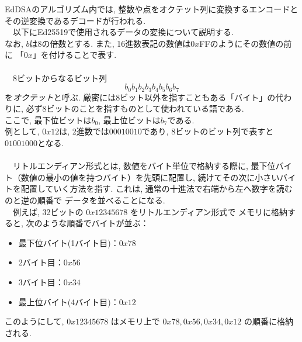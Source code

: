 EdDSAのアルゴリズム内では, 整数や点をオクテット列に変換するエンコードと
その逆変換であるデコードが行われる\cite{インフォーズ}.\\
　以下にEd25519で使用されるデータの変換について説明する.\\
なお, $b$は8の倍数とする. 
また, 16進数表記の数値は$0x$FFのようにその数値の前に
「$0x$」を付けることで表す.\\[1em]

\\
　8ビットからなるビット列
\[
b_0b_1b_2b_3b_4b_5b_6b_7
\]
を\emph{オクテット}と呼ぶ.
厳密には8ビット以外を指すこともある「バイト」の代わりに, 
必ず8ビットのことを指すものとして使われている語である.\\
ここで, 最下位ビットは$b_0$, 最上位ビットは$b_7$である.\\
\indent 例として, $0x12$は, 2進数では$00010010$であり, 
8ビットのビット列で表すと$01001000$となる.\\ 

\\
　リトルエンディアン形式とは, 数値をバイト単位で格納する際に, 
最下位バイト（数値の最小の値を持つバイト）を先頭に配置し, 
続けてその次に小さいバイトを配置していく方法を指す.
これは, 通常の十進法で右端から左へ数字を読むのと逆の順番で
データを並べることになる.\\
　例えば, 32ビットの $0x12345678$ をリトルエンディアン形式で
メモリに格納すると, 次のような順番でバイトが並ぶ：
\begin{itemize}
  \item 最下位バイト(1バイト目)：$0x78$
  \item 2バイト目：$0x56$
  \item 3バイト目：$0x34$
  \item 最上位バイト(4バイト目)：$0x12$
\end{itemize}
\noindent このようにして, $0x12345678$ はメモリ上で 
$0x78, 0x56, 0x34, 0x12$ の順番に格納される.\\[1em]

